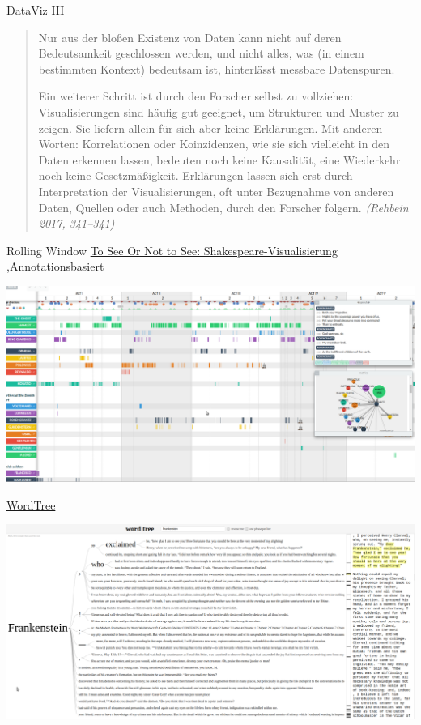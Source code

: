 \documentclass[10pt]{beamer}
\begin{document}
\begin{frame}[allowframebreaks]{DataViz III}
\begin{quote}\small
Nur aus der bloßen Existenz von Daten kann nicht auf deren Bedeutsamkeit geschlossen werden, und nicht alles, was (in einem bestimmten Kontext) bedeutsam ist, hinterlässt messbare Datenspuren.

Ein weiterer Schritt ist durch den Forscher selbst zu vollziehen: Visualisierungen sind häufig gut geeignet, um Strukturen und Muster zu zeigen. Sie liefern allein für sich aber keine Erklärungen. Mit anderen Worten: Korrelationen oder Koinzidenzen, wie sie sich vielleicht in den Daten erkennen lassen, bedeuten noch keine Kausalität, eine Wiederkehr noch keine Gesetzmäßigkeit. Erklärungen lassen sich erst durch Interpretation der Visualisierungen, oft unter Bezugnahme von anderen Daten, Quellen oder auch Methoden, durch den Forscher folgern. \emph{(Rehbein 2017, 341--341)}
\end{quote}
\end{frame}


\begin{frame}{Rolling Window}
\href{http://www.thomaswilhelm.eu/shakespeare/output/hamlet.html}{To See Or Not to See: Shakespeare-Visualisierung} \sep Annotationsbasiert

\includegraphics[width=\textwidth]{toSeeOrNotToSee.png}
\end{frame}


\begin{frame}{\href{https://www.jasondavies.com/wordtree/}{WordTree}}

\includegraphics[width=\textwidth]{wordTree.png}
\end{frame}
\end{document}
